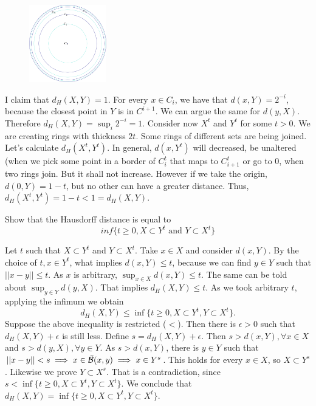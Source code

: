 \begin{figure}[H]
    \centering
    \includegraphics[width = 0.3\textwidth]{../images/circle-inside-circle.png}
\end{figure}

I claim that $d_H(X,Y) = 1$. For every $x \in C_i$, we have that $d(x,Y) =
2^{-i}$, because the closest point in $Y$ is in $C^{i+1}$. We can argue the
same for $d(y,X)$. Therefore $d_H(X,Y) = \sup_i 2^{-i} = 1$. Consider now
$X^t$ and $Y^t$ for some $t > 0$. We are creating rings with thickness $2t$.
Some rings of different sets are being joined. Let's calculate $d_H(X^t,
Y^t)$. In general, $d(x,Y^t)$ will decreased, be unaltered (when we pick some
point in a border of $C_i^t$ that maps to $C_{i+1}^t$ or go to $0$, when two
rings join. But it shall not increase. However if we take the origin, $d(0,Y)
= 1 - t$, but no other can have a greater distance. Thus, $d_H(X^t, Y^t) = 1-t
< 1 = d_H(X, Y)$. 

\noindent\linia

\begin{exercise}
    Show that the Hausdorff distance is equal to
    $$inf\{t \ge 0, X \subset Y^t \text{ and } Y \subset X^t\}$$
\end{exercise}

Let $t$ such that $X \subset Y^t$ and $Y \subset X^t$. Take $x \in X$ and
consider $d(x,Y)$. By the choice of $t, x \in Y^t$, what implies $d(x,Y) \le
t$, because we can find $y \in Y$ such that $||x - y|| \le t$. As $x$ is
arbitrary, $\sup_{x \in X} d(x,Y) \le t$. The same can be told about $\sup_{y
\in Y} d(y, X)$. That implies $d_H(X,Y) \le t$. As we took arbitrary $t$,
applying the infimum we obtain 
$$d_H(X,Y) \le \inf\{t \ge 0, X \subset Y^t, Y \subset X^t\}.$$
Suppose the above inequality is restricted ($<$). Then there is $\epsilon > 0$
such that $d_H(X, Y) + \epsilon$ is still less. Define $s = d_H(X,Y) + \epsilon$. Then $s > d(x,Y), \forall x \in X$ and $s > d(y,
X), \forall y \in Y$. As $s > d(x,Y)$, there is $y \in Y$ such that $||x - y||
< s \implies x \in \bar{\mathcal{B}}(x,y) \implies x \in Y^s$. This holds for every $x
\in X$, so $X \subset Y^s$. Likewise we prove $Y \subset X^s$. That is a
contradiction, since $s < \inf\{t \ge 0, X \subset Y^t, Y \subset X^t\}$. We
conclude that $d_H(X, Y) = \inf\{t \ge 0, X \subset Y^t, Y \subset X^t\}.$  

